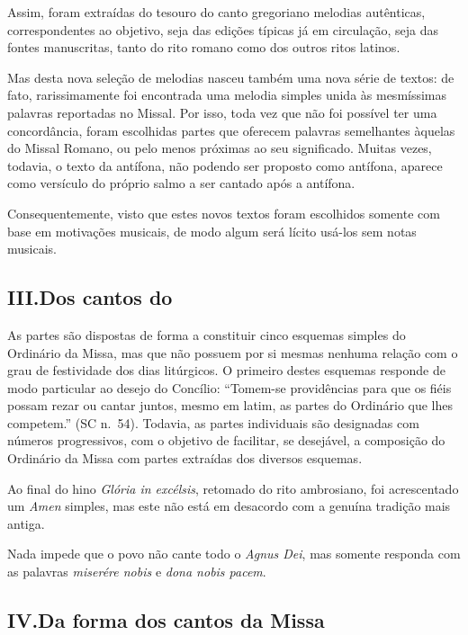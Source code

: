  Assim, foram extraídas do tesouro do canto gregoriano melodias autênticas, correspondentes ao objetivo, seja das edições típicas já em circulação, seja das fontes manuscritas, tanto do rito romano como dos outros ritos latinos.

 Mas desta nova seleção de melodias nasceu também uma nova série de textos: de fato, rarissimamente foi encontrada uma melodia simples unida às mesmíssimas palavras reportadas no Missal. Por isso, toda vez que não foi possível ter uma concordância, foram escolhidas partes que oferecem palavras semelhantes àquelas do Missal Romano, ou pelo menos próximas ao seu significado. Muitas vezes, todavia, o texto da antífona, não podendo ser proposto como antífona, aparece como versículo do próprio salmo a ser cantado após a antífona.

 Consequentemente, visto que estes novos textos foram escolhidos somente com base em motivações musicais, de modo algum será lícito usá-los sem notas musicais.

\subsection*{III.\@ Dos cantos do {\KS}}\label{subsection*:praenotanda-3}

 As partes são dispostas de forma a constituir cinco esquemas simples do Ordinário da Missa, mas que não possuem por si mesmas nenhuma relação com o grau de festividade dos dias litúrgicos. O primeiro destes esquemas responde de modo particular ao desejo do Concílio: ``Tomem-se providências para que os fiéis possam rezar ou cantar juntos, mesmo em latim, as partes do Ordinário que lhes competem.'' (SC n.\ 54). Todavia, as partes individuais são designadas com números progressivos, com o objetivo de facilitar, se desejável, a composição do Ordinário da Missa com partes extraídas dos diversos esquemas.

 Ao final do hino \textcolor{gregoriocolor}{\emph{Glória in excélsis}}, retomado do rito ambrosiano, foi acrescentado um \textcolor{gregoriocolor}{\emph{Amen}} simples, mas este não está em desacordo com a genuína tradição mais antiga.

 Nada impede que o povo não cante todo o \textcolor{gregoriocolor}{\emph{Agnus Dei}}, mas somente responda com as palavras \textcolor{gregoriocolor}{\emph{miserére nobis}} e \textcolor{gregoriocolor}{\emph{dona nobis pacem}}.

\subsection*{IV.\@ Da forma dos cantos da Missa}

